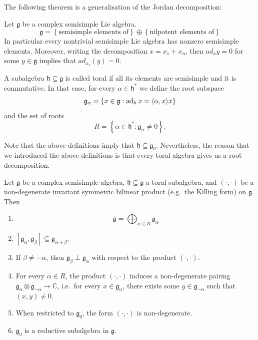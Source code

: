 \documentclass{report}
\begin{document}
The following theorem is a generalisation of the Jordan decomposition:
\begin{theorem}
    Let $\mathfrak g$ be a complex semisimple Lie algebra. 
    \[
    \mathfrak g = \left\{ \text{semisimple elements of} \right\} \oplus \left\{ \text{nilpotent elements of} \right\}
    \]
    In particular every nontrivial semisimple Lie algebra has nonzero semisimple elements.
    Moreover, writing the decomposition $x = x_s + x_n$, then $ad_x y = 0$ for some $y \in \mathfrak g$ implies that $ad_{x_s}(y) = 0$.
\end{theorem}
\begin{definition}
    A subalgebra $\mathfrak h \subseteq \mathfrak g$ is called toral if all its elements are semisimple and it is commutative.
    In that case, for every $\alpha \in \mathfrak h^*$ we define the root subspace
    \[
    \mathfrak g_\alpha = \left\{ x \in \mathfrak g : \operatorname{ad}_h x = \langle \alpha, x \rangle x \right\}
    \]
    and the set of roots 
    \[
    R = \left\{ \alpha \in \mathfrak h^* : \mathfrak g_\alpha \neq 0 \right\}.
    \]
\end{definition}
Note that the above definitions imply that $\mathfrak h \subseteq \mathfrak g_0$.
Nevertheless, the reason that we introduced the above definitions is that every toral algebra gives us a root decomposition.
\begin{theorem}
    Let $\mathfrak g$ be a complex semisimple algebra, $\mathfrak h \subseteq \mathfrak g$ a toral subalgebra, and $(\cdot, \cdot)$ be a non-degenerate invariant symmetric bilinear product (e.g.\ the Killing form) on $\mathfrak g$.
    Then
    \begin{enumerate}[label = (\roman*)]
        \item \[
        \mathfrak g = \bigoplus_{\alpha \in R} \mathfrak g_{\alpha}
        \]
        \item $[\mathfrak g_\alpha, \mathfrak g_\beta] \subseteq \mathfrak g_{\alpha+\beta}$.
        \item If $\beta \neq - \alpha$, then $\mathfrak g_\beta \perp \mathfrak g_\alpha$ with respect to the product $(\cdot, \cdot)$.
        \item For every $\alpha \in R$, the product $(\cdot, \cdot)$ induces a non-degenerate pairing $\mathfrak g_\alpha \otimes \mathfrak g_{-\alpha} \to \mathbb C$, i.e.\ for every $x \in \mathfrak g_\alpha$, there exists some $y \in \mathfrak g_{-\alpha}$ such that $(x,y) \neq 0$.
        \item When restricted to $\mathfrak g_0$, the form $(\cdot, \cdot)$ is non-degenerate.
        \item $\mathfrak g_0$ is a reductive subalgebra in $\mathfrak g$.
    \end{enumerate}
\end{theorem}
\end{document}
